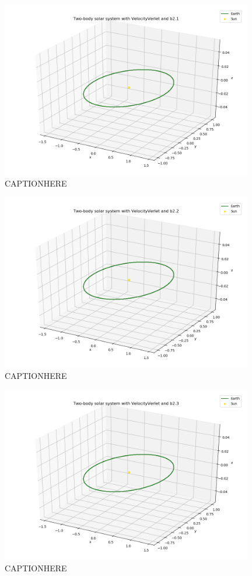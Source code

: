 \documentclass{article}
\begin{document}
    \begin{figure}[H]
        \centering
        \includegraphics[width = 11cm]{img/plot3D_S_E_V_b21.png}
        \caption{CAPTIONHERE}
        \label{fig:plot3D_S_E_V_b21}
    \end{figure}

    \begin{figure}[H]
        \centering
        \includegraphics[width = 11cm]{img/plot3D_S_E_V_b22.png}
        \caption{CAPTIONHERE}
        \label{fig:plot3D_S_E_V_b22}
    \end{figure}

    \begin{figure}[H]
        \centering
        \includegraphics[width = 11cm]{img/plot3D_S_E_V_b23.png}
        \caption{CAPTIONHERE}
        \label{fig:plot3D_S_E_V_b23}
    \end{figure}
\end{document}
